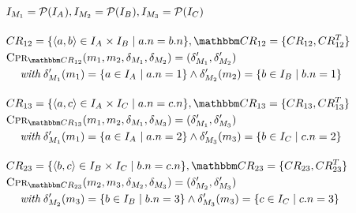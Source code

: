\begin{align*}
    & 
    \metamodelinstanceset{M}{1} = \mathcal{P}(\instances{\class{A}{}}), %
    \metamodelinstanceset{M}{2} = \mathcal{P}(\instances{\class{B}{}}), %
    \metamodelinstanceset{M}{3} = \mathcal{P}(\instances{\class{C}{}}) \\[1em]
    &
    \consistencyrelation{CR}{12} = \setted{\tupled{a,b} \in \instances{\class{A}{}} \times \instances{\class{B}{}} \mid a.n = b.n}, \consistencyrelationset{CR}_{12} = \setted{\consistencyrelation{CR}{12}, \consistencyrelation{CR}{12}^T} \\
    &
    \consistencypreservationrule{\consistencyrelationset{CR}_{12}}(\model{m}{1}, \model{m}{2}, \change{\metamodel{M}{1}}, \change{\metamodel{M}{2}}) = (\change{\metamodel{M}{1}}', \change{\metamodel{M}{2}}') \\
    & \formulaskip
        \withmath \change{\metamodel{M}{1}}'(\model{m}{1}) = \setted{a \in \instances{\class{A}{}} \mid a.n = 1} \land \change{\metamodel{M}{2}}'(\model{m}{2}) = \setted{b \in \instances{\class{B}{}} \mid b.n = 1} \\[1em]
    &
    \consistencyrelation{CR}{13} = \setted{\tupled{a,c} \in \instances{\class{A}{}} \times \instances{\class{C}{}} \mid a.n = c.n}, \consistencyrelationset{CR}_{13} = \setted{\consistencyrelation{CR}{13}, \consistencyrelation{CR}{13}^T} \\
    &
    \consistencypreservationrule{\consistencyrelationset{CR}_{13}}(\model{m}{1}, \model{m}{2}, \change{\metamodel{M}{1}}, \change{\metamodel{M}{3}}) = (\change{\metamodel{M}{1}}', \change{\metamodel{M}{3}}') \\
    & \formulaskip
        \withmath \change{\metamodel{M}{1}}'(\model{m}{1}) = \setted{a \in \instances{\class{A}{}} \mid a.n = 2} \land \change{\metamodel{M}{3}}'(\model{m}{3}) = \setted{b \in \instances{\class{C}{}} \mid c.n = 2} \\[1em]
    &
    \consistencyrelation{CR}{23} = \setted{\tupled{b,c} \in \instances{\class{B}{}} \times \instances{\class{C}{}} \mid b.n = c.n}, \consistencyrelationset{CR}_{23} = \setted{\consistencyrelation{CR}{23}, \consistencyrelation{CR}{23}^T} \\
    &
    \consistencypreservationrule{\consistencyrelationset{CR}_{23}}(\model{m}{2}, \model{m}{3}, \change{\metamodel{M}{2}}, \change{\metamodel{M}{3}}) = (\change{\metamodel{M}{2}}', \change{\metamodel{M}{3}}') \\
    & \formulaskip
        \withmath \change{\metamodel{M}{2}}'(\model{m}{3}) = \setted{b \in \instances{\class{B}{}} \mid b.n = 3} \land \change{\metamodel{M}{3}}'(\model{m}{3}) = \setted{c \in \instances{\class{C}{}} \mid c.n = 3}
\end{align*}

